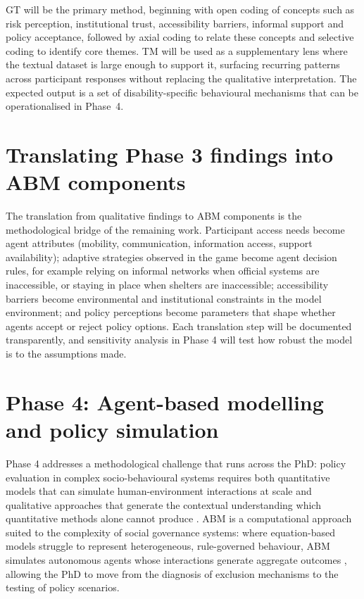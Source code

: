 \documentclass[12pt,a4paper]{report}
\begin{document}
GT will be the primary method, beginning with open coding of concepts such as risk perception, institutional trust, accessibility barriers, informal support and policy acceptance, followed by axial coding to relate these concepts and selective coding to identify core themes. TM will be used as a supplementary lens where the textual dataset is large enough to support it, surfacing recurring patterns across participant responses without replacing the qualitative interpretation. The expected output is a set of disability-specific behavioural mechanisms that can be operationalised in Phase~4.


\section{Translating Phase 3 findings into ABM components}
The translation from qualitative findings to ABM components is the methodological bridge of the remaining work. Participant access needs become agent attributes (mobility, communication, information access, support availability); adaptive strategies observed in the game become agent decision rules, for example relying on informal networks when official systems are inaccessible, or staying in place when shelters are inaccessible; accessibility barriers become environmental and institutional constraints in the model environment; and policy perceptions become parameters that shape whether agents accept or reject policy options. Each translation step will be documented transparently, and sensitivity analysis in Phase 4 will test how robust the model is to the assumptions made.

\section{Phase 4: Agent-based modelling and policy simulation}

Phase 4 addresses a methodological challenge that runs across the PhD: policy evaluation in complex socio-behavioural systems requires both quantitative models that can simulate human-environment interactions at scale \cite{swart2004problem} and qualitative approaches that generate the contextual understanding which quantitative methods alone cannot produce \cite{moezzi2017using}. ABM is a computational approach suited to the complexity of social governance systems: where equation-based models struggle to represent heterogeneous, rule-governed behaviour, ABM simulates autonomous agents whose interactions generate aggregate outcomes \cite{macal2005tutorial,bonabeau1999swarm}, allowing the PhD to move from the diagnosis of exclusion mechanisms to the testing of policy scenarios.
\end{document}
